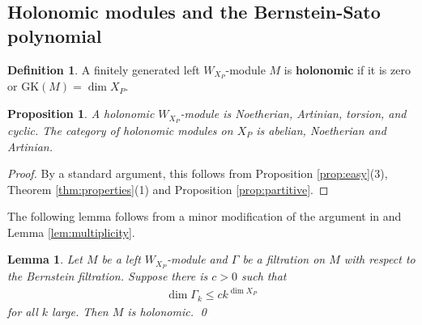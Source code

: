 \documentclass[11pt,a4paper,usenames,dvipsnames,reqno]{amsart}
\numberwithin{equation}{section}
\newcommand{\cc}{\mathbb C}
\newcommand{\fg}{\mathfrak g}
\newcommand{\fp}{\mathfrak p}
\newcommand{\der}{\mathrm{der}}
\newtheorem{Prop}[Thm]{Proposition}
\newtheorem{Lem}[Thm]{Lemma}
\theoremstyle{definition}
\newtheorem{Def}[Thm]{Definition}
\theoremstyle{remark}
\begin{document}


\subsection{Holonomic modules and the Bernstein-Sato polynomial}


\begin{Def}
A finitely generated left $W_{X_P}$-module $M$ is \textbf{holonomic} if it is zero or $\mathrm{GK}(M)=\dim X_P$.
\end{Def}



\begin{Prop}\label{prop:basicholonomic}
A holonomic $W_{X_P}$-module is Noetherian, Artinian, torsion, and cyclic.  The category of holonomic modules on $X_P$ is abelian, Noetherian and Artinian.
\end{Prop}

\begin{proof}
   By a standard argument, this follows from Proposition \ref{prop:easy}(3), Theorem \ref{thm:properties}(1) and Proposition \ref{prop:partitive}.
\end{proof}

The following lemma follows from a minor modification of the argument in \cite[Lemma 10.3.1]{C:Dmod} and Lemma  \ref{lem:multiplicity}.
\begin{Lem}\label{lem:growth}
Let $M$ be a left $W_{X_P}$-module and $\Gamma$ be a filtration on $M$ with respect to the Bernstein filtration. Suppose there is $c>0$ such that
\begin{align*}
    \dim \Gamma_k\le ck^{\dim X_P}
\end{align*}
for all $k$ large. Then $M$ is holonomic. \qed
\end{Lem}
\end{document}
